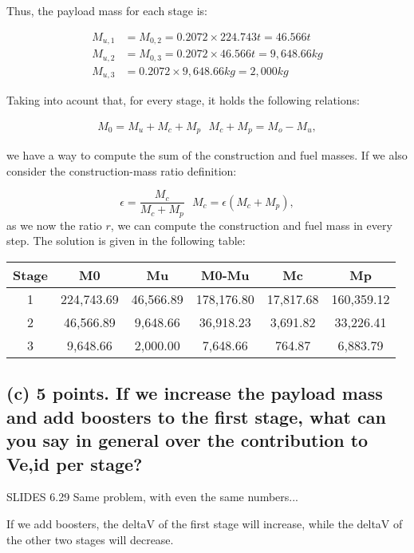 Thus, the payload mass for each stage is:

\begin{align}
M_{u,1} &= M_{0,2} =  0.2072\times 224.743 t = 46.566 t \\
M_{u,2} &= M_{0,3} = 0.2072\times 46.566 t = 9,648.66 kg \\
M_{u,3} &=  0.2072\times 9,648.66 kg = 2,000 kg 
\end{align}

Taking into acount that, for every stage, it holds the following relations:

\begin{align}
M_0 = M_u + M_c + M_p \ \ \ M_c + M_p = M_o - M_u,
\end{align}

we have a way to compute the sum of the construction and fuel masses. If we also consider the construction-mass ratio definition:

\begin{equation}
\epsilon = \frac{M_c}{M_c + M_p} \ \ \ M_c = \epsilon(M_c + M_p),
\end{equation}
as we now the ratio $r$, we can compute the construction and fuel mass in every step. The solution is given in the following table: 
\begin{table}[H]
	\centering
\begin{tabular}{|c|c|c|c|c|c|}
	\hline 
	Stage & M0 & Mu & M0-Mu & Mc & Mp \\ 
	\hline 
	1 & 224,743.69 & 46,566.89 & 178,176.80 & 17,817.68 & 160,359.12 \\
	2 & 46,566.89  & 9,648.66  & 36,918.23  & 3,691.82  & 33,226.41  \\
	3 & 9,648.66   & 2,000.00  & 7,648.66   & 764.87    & 6,883.79 \\
	\hline 
\end{tabular} 
\end{table}

\subsection{(c) 5 points. If we increase the payload mass and add boosters to the first stage, what can you say in general over the contribution to Ve,id per stage?}

SLIDES 6.29 Same problem, with even the same numbers... 

If we add boosters, the deltaV of the first stage will increase, while the deltaV of the other two stages will decrease. 